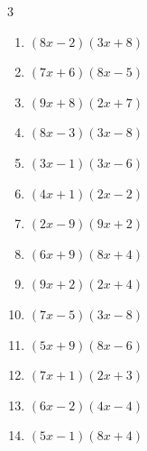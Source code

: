 \begin{multicols}{3}
\begin{enumerate}
  \item $(8x-2)(3x+8)$


  \item $(7x+6)(8x-5)$


  \item $(9x+8)(2x+7)$


  \item $(8x-3)(3x-8)$


  \item $(3x-1)(3x-6)$


\columnbreak %

\resetques

  \item $(4x+1)(2x-2)$


  \item $(2x-9)(9x+2)$


  \item $(6x+9)(8x+4)$


  \item $(9x+2)(2x+4)$


  \item $(7x-5)(3x-8)$


  \item $(5x+9)(8x-6)$


  \item $(7x+1)(2x+3)$


  \item $(6x-2)(4x-4)$


  \item $(5x-1)(8x+4)$



\end{enumerate}
\end{multicols}
